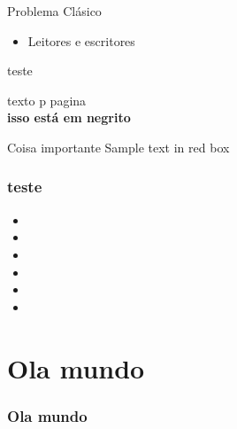 \documentclass{beamer}
\begin{document}
\begin{frame}{Problema Clásico}
    
	\begin{itemize}
		\item Leitores e escritores
	\end{itemize}
\end{frame}


\begin{frame}
	teste
	
\end{frame}

	\begin{frame}
		texto p pagina \thepage\\
		\textbf{isso está em negrito}

		\begin{alertblock}{Coisa importante}
			Sample text in red box
		\end{alertblock}
	\end{frame}

	\begin{frame}
		\frametitle{teste}
		\begin{itemize}
			\item 
			\item 
			\item 
			\item 
			\item 
			\item 
		\end{itemize}
	\end{frame}
	\section{Ola mundo}
	\begin{frame}
		\frametitle{Ola mundo}
	\end{frame}
\end{document}
